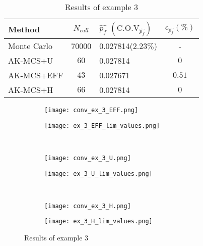 \begin{table}[h]
    \footnotesize
    \begin{center}
    \begin{tabular}{lclc}
    \toprule
    Method & $N_{call}$  & $\widehat{p_f}$ $(\text{C.O.V}_{\widehat{p_f}})$ &$\epsilon_{\widehat{p_f}}(\%)$  \\
    \midrule
    Monte Carlo   & \num[round-precision=1,round-mode=figures]{70000} & \num{0.027814}($2.23\%$) & - \\
    AK-MCS+U & $60$ & \num{0.027814} & $0$ \\
    AK-MCS+EFF & $43$ & \num{0.027671} & $0.51$ \\
    AK-MCS+H & $66$ & \num{0.027814} & $0$ \\
    \bottomrule
    \end{tabular}
    \end{center}
    \caption{Results of example 3}
    \label{tab:res_ex3}
\end{table}

\begin{figure*}[h]
    \begin{subfigure}{.5\textwidth}
        \centering
        \texttt{[image: conv\_ex\_3\_EFF.png]}
      \end{subfigure}%
      \begin{subfigure}{.5\textwidth}
        \centering
        \texttt{[image: ex\_3\_EFF\_lim\_values.png]}
      \end{subfigure}%
      \\
      \begin{subfigure}{.5\textwidth}
        \centering
        \texttt{[image: conv\_ex\_3\_U.png]}
      \end{subfigure}%
      \begin{subfigure}{.5\textwidth}
        \centering
        \texttt{[image: ex\_3\_U\_lim\_values.png]}
      \end{subfigure}%
      \\    \begin{subfigure}{.5\textwidth}
        \centering
        \texttt{[image: conv\_ex\_3\_H.png]}
      \end{subfigure}%
      \begin{subfigure}{.5\textwidth}
        \centering
        \texttt{[image: ex\_3\_H\_lim\_values.png]}
      \end{subfigure}%
      \caption{Results of example 3}
      \label{fig:ex3_results}
\end{figure*}